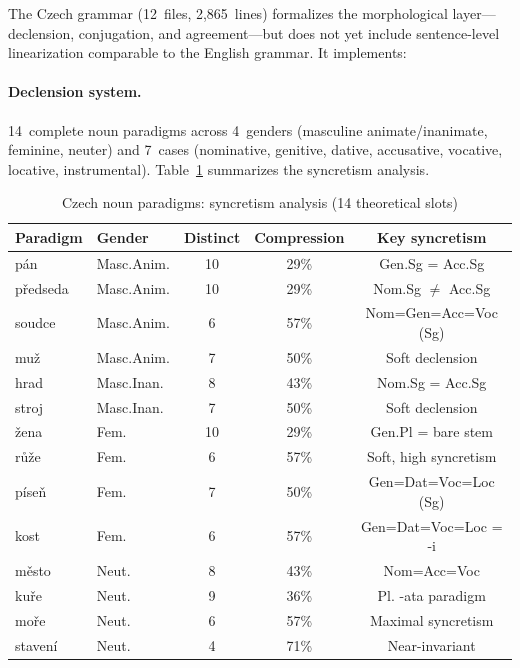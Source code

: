 \documentclass[11pt]{article}
\begin{document}
The Czech grammar (12~files, 2,865~lines) formalizes the morphological
layer---declension, conjugation, and agreement---but does not yet include
sentence-level linearization comparable to the English grammar.
It implements:

\paragraph{Declension system.}  14~complete noun paradigms across 4~genders
(masculine animate/inanimate, feminine, neuter) and 7~cases (nominative,
genitive, dative, accusative, vocative, locative, instrumental).
Table~\ref{tab:czech} summarizes the syncretism analysis.

\begin{table}[ht]
\centering
\caption{Czech noun paradigms: syncretism analysis (14 theoretical slots)}
\label{tab:czech}
\small
\begin{tabular}{@{}llccc@{}}
\toprule
\textbf{Paradigm} & \textbf{Gender} & \textbf{Distinct} & \textbf{Compression} & \textbf{Key syncretism} \\
\midrule
p\'{a}n     & Masc.Anim.  & 10 & 29\% & Gen.Sg = Acc.Sg \\
p\v{r}edseda & Masc.Anim. & 10 & 29\% & Nom.Sg $\neq$ Acc.Sg \\
soudce      & Masc.Anim.  &  6 & 57\% & Nom=Gen=Acc=Voc (Sg) \\
mu\v{z}     & Masc.Anim.  &  7 & 50\% & Soft declension \\
hrad        & Masc.Inan.  &  8 & 43\% & Nom.Sg = Acc.Sg \\
stroj       & Masc.Inan.  &  7 & 50\% & Soft declension \\
\v{z}ena    & Fem.        & 10 & 29\% & Gen.Pl = bare stem \\
r\r{u}\v{z}e & Fem.       &  6 & 57\% & Soft, high syncretism \\
p\'{i}se\v{n} & Fem.      &  7 & 50\% & Gen=Dat=Voc=Loc (Sg) \\
kost        & Fem.        &  6 & 57\% & Gen=Dat=Voc=Loc = -i \\
m\v{e}sto   & Neut.       &  8 & 43\% & Nom=Acc=Voc \\
ku\v{r}e    & Neut.       &  9 & 36\% & Pl. -ata paradigm \\
mo\v{r}e    & Neut.       &  6 & 57\% & Maximal syncretism \\
staven\'{i} & Neut.       &  4 & 71\% & Near-invariant \\
\bottomrule
\end{tabular}
\end{table}
\end{document}

